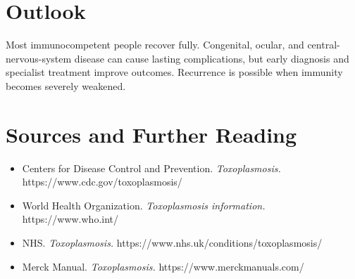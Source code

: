 \section*{Outlook}
Most immunocompetent people recover fully. Congenital, ocular, and central-nervous-system disease can cause lasting complications, but early diagnosis and specialist treatment improve outcomes. Recurrence is possible when immunity becomes severely weakened.

\section*{Sources and Further Reading}
\begin{itemize}
    \item Centers for Disease Control and Prevention. \textit{Toxoplasmosis.} https://www.cdc.gov/toxoplasmosis/
    \item World Health Organization. \textit{Toxoplasmosis information.} https://www.who.int/
    \item NHS. \textit{Toxoplasmosis.} https://www.nhs.uk/conditions/toxoplasmosis/
    \item Merck Manual. \textit{Toxoplasmosis.} https://www.merckmanuals.com/
\end{itemize}
